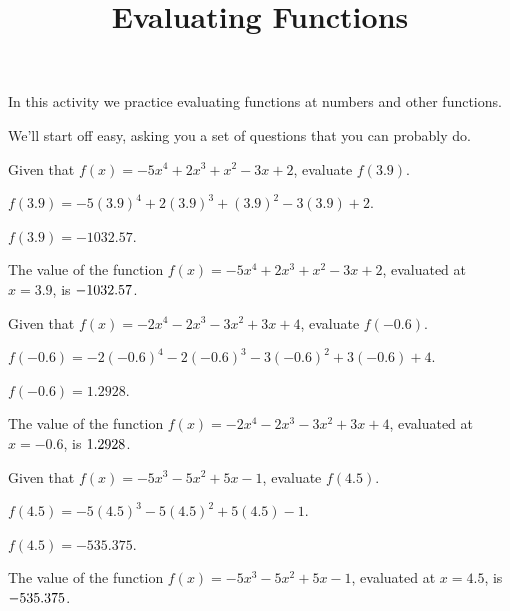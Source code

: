 \documentclass[handout]{ximera}
\begin{document}
\title{Evaluating Functions}
\maketitle


\begin{headline} %
In this activity we practice evaluating functions at numbers and other
functions.
\end{headline}


We'll start off easy, asking you a set of questions that you can
probably do.


\begin{shuffle}
\begin{exercise}
Given that $f(x)=-5 x^4+2 x^3+x^2-3 x+2$, evaluate $f(3.9)$.
\begin{solution}
\begin{hint}
$f(3.9)=-5 (3.9)^4+2 (3.9)^3+(3.9)^2-3 (3.9)+2$.
\end{hint}
\begin{hint}
$f(3.9)=-1032.57$.
\end{hint}
The value of the function $f(x) = -5 x^4+2 x^3+x^2-3 x+2$, evaluated at $x=3.9$, is ${-1032.57}$.
\end{solution}
\end{exercise}

\begin{exercise}
Given that $f(x)=-2 x^4-2 x^3-3 x^2+3 x+4$, evaluate $f(-0.6)$.
\begin{solution}
\begin{hint}
$f(-0.6)=-2 (-0.6)^4-2 (-0.6)^3-3 (-0.6)^2+3 (-0.6)+4$.
\end{hint}
\begin{hint}
$f(-0.6)=1.2928$.
\end{hint}
The value of the function $f(x) = -2 x^4-2 x^3-3 x^2+3 x+4$, evaluated at $x=-0.6$, is ${1.2928}$.
\end{solution}
\end{exercise}

\begin{exercise}
Given that $f(x)=-5 x^3-5 x^2+5 x-1$, evaluate $f(4.5)$.
\begin{solution}
\begin{hint}
$f(4.5)=-5 (4.5)^3-5 (4.5)^2+5 (4.5)-1$.
\end{hint}
\begin{hint}
$f(4.5)=-535.375$.
\end{hint}
The value of the function $f(x) = -5 x^3-5 x^2+5 x-1$, evaluated at $x=4.5$, is ${-535.375}$.
\end{solution}
\end{exercise}


\end{shuffle}
\end{document}
